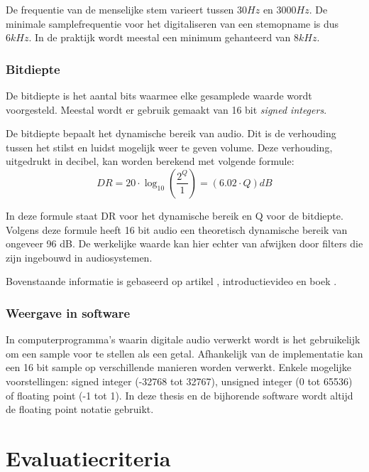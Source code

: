 De frequentie van de menselijke stem varieert tussen $ 30 Hz $ en $ 3000 Hz $. De minimale samplefrequentie voor het digitaliseren van een stemopname is dus $ 6kHz $. In de praktijk wordt meestal een minimum gehanteerd van $ 8kHz $.

\subsubsection{Bitdiepte}

De bitdiepte is het aantal bits waarmee elke gesamplede waarde wordt voorgesteld. Meestal wordt er gebruik gemaakt van 16 bit \textit{signed integers}.

De bitdiepte bepaalt het dynamische bereik van audio. Dit is de verhouding tussen het stilst en luidst mogelijk weer te geven volume. Deze verhouding, uitgedrukt in decibel, kan worden berekend met volgende formule: 
\begin{equation}
DR = 20 \cdot \log_{10} \left(\frac{2^Q}{1}\right) = (6.02 \cdot Q) dB
\end{equation}

In deze formule staat DR voor het dynamische bereik en Q voor de bitdiepte. Volgens deze formule heeft 16 bit audio een theoretisch dynamische bereik van ongeveer 96 dB. De werkelijke waarde kan hier echter van afwijken door filters die zijn ingebouwd in audiosystemen.

Bovenstaande informatie is gebaseerd op artikel \cite{tarsosmanual2016}, introductievideo \cite{xiph2016} en boek \cite{fries2005digital}.

\subsubsection{Weergave in software}

In computerprogramma's waarin digitale audio verwerkt wordt is het gebruikelijk om een sample voor te stellen als een getal. Afhankelijk van de implementatie kan een 16 bit sample op verschillende manieren worden verwerkt. Enkele mogelijke voorstellingen: signed integer (-32768 tot 32767), unsigned integer (0 tot 65536) of floating point (-1 tot 1). 
In deze thesis en de bijhorende software wordt altijd de floating point notatie gebruikt.

\section{Evaluatiecriteria}
\label{evaluatie-criteria}

